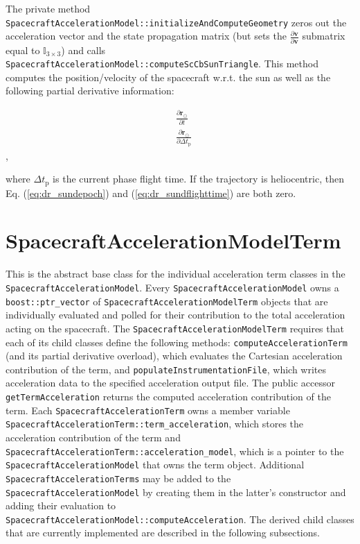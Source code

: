 The private method \texttt{SpacecraftAccelerationModel::initializeAndComputeGeometry} zeros out the acceleration vector and the state propagation matrix (but sets the $\frac{\partial \mathbf{v}}{\partial \mathbf{v}}$ submatrix equal to $\mathbb{I}_{3\times3}$) and calls \texttt{SpacecraftAccelerationModel::computeScCbSunTriangle}. This method computes the position/velocity of the spacecraft w.r.t. the sun as well as the following partial derivative information:

\begin{align}
    &\frac{\partial \mathbf{r}_{\odot}}{\partial t} \label{eq:dr_sundepoch} \\
    &\frac{\partial \mathbf{r}_{\odot}}{\partial \Delta t_{\text{p}}} \label{eq:dr_sundflighttime}
\end{align},

\noindent where $\Delta t_{\text{p}}$ is the current phase flight time. If the trajectory is heliocentric, then Eq. (\ref{eq:dr_sundepoch}) and (\ref{eq:dr_sundflighttime}) are both zero.


\section{SpacecraftAccelerationModelTerm}
\label{sec:SpacecraftAccelerationModelTerm}

This is the abstract base class for the individual acceleration term classes in the \texttt{SpacecraftAccelerationModel}. Every \texttt{SpacecraftAccelerationModel} owns a \texttt{boost::ptr\_vector} of \texttt{SpacecraftAccelerationModelTerm} objects that are individually evaluated and polled for their contribution to the total acceleration acting on the spacecraft. The \texttt{SpacecraftAccelerationModelTerm} requires that each of its child classes define the following methods: \texttt{computeAccelerationTerm} (and its partial derivative overload), which evaluates the Cartesian acceleration contribution of the term, and \texttt{populateInstrumentationFile}, which writes acceleration data to the specified acceleration output file. The public accessor \texttt{getTermAcceleration} returns the computed acceleration contribution of the term. Each \texttt{SpacecraftAccelerationTerm} owns a member variable \texttt{SpacecraftAccelerationTerm::term\_acceleration}, which stores the acceleration contribution of the term and \texttt{SpacecraftAccelerationTerm::acceleration\_model}, which is a pointer to the \texttt{SpacecraftAccelerationModel} that owns the term object. Additional \texttt{SpacecraftAccelerationTerms} may be added to the \texttt{SpacecraftAccelerationModel} by creating them in the latter's constructor and adding their evaluation to \texttt{SpacecraftAccelerationModel::computeAcceleration}. The derived child classes that are currently implemented are described in the following subsections.

